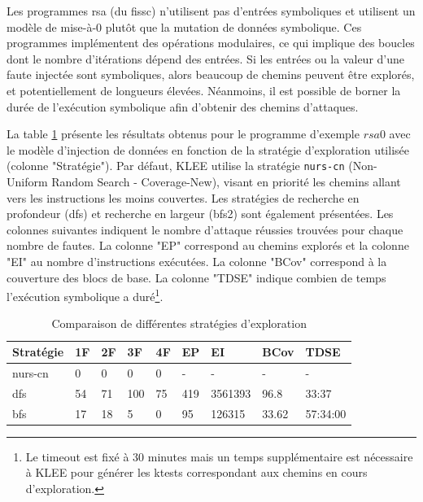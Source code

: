             Les programmes \gls{rsa} (du \gls{fissc}) n'utilisent pas d'entrées symboliques et utilisent un modèle de mise-à-0 plutôt que la mutation de données symbolique.
            Ces programmes implémentent des opérations modulaires, ce qui implique des boucles dont le nombre d'itérations dépend des entrées.
            Si les entrées ou la valeur d'une faute injectée sont symboliques, alors beaucoup de chemins peuvent être explorés, et potentiellement de longueurs élevées. 
            Néanmoins, il est possible de borner la durée de l'exécution symbolique afin d'obtenir des chemins d'attaques.
            
            La table \ref{tbl:ch3:exp:rsa-strat} présente les résultats obtenus pour le programme d'exemple $rsa0$ avec le modèle d'injection de données en fonction de la stratégie d'exploration utilisée (colonne "Stratégie"). Par défaut, KLEE utilise la stratégie \texttt{nurs-cn} (Non-Uniform Random Search - Coverage-New), visant en priorité les chemins allant vers les instructions les moins couvertes. Les stratégies de recherche en profondeur (\gls{dfs}) et recherche en largeur (\gls{bfs2}) sont également présentées.
            Les colonnes suivantes indiquent le nombre d'attaque réussies trouvées pour chaque nombre de fautes.
            La colonne "EP" correspond au chemins explorés et la colonne "EI" au nombre d'instructions exécutées.
            La colonne "BCov" correspond à la couverture des blocs de base.
            La colonne "TDSE" indique combien de temps l'exécution symbolique a duré\footnote{Le timeout est fixé à 30 minutes mais un temps supplémentaire est nécessaire à KLEE pour générer les ktests correspondant aux chemins en cours d'exploration.}.
            
            \begin{table}[ht]
                \small
                    \caption{Comparaison de différentes stratégies d'exploration}\label{tbl:ch3:exp:rsa-strat}
                \begin{center}
                \setlength\tabcolsep{4pt}
                \begin{tabular}{l|llll|llll}
                Stratégie &1F & 2F & 3F & 4F & EP & EI & BCov & TDSE \\
                \hline
                nurs-cn &  0 & 0 & 0 & 0 & - & - & - & - \\
                dfs &  54 & 71 & 100 & 75 & 419 & 3561393 & 96.8 & 33:37 \\
                bfs &  17 & 18 & 5 & 0 & 95 & 126315 & 33.62 & 57:34:00 \\
                \end{tabular}
                \end{center}
            \end{table} 
            
